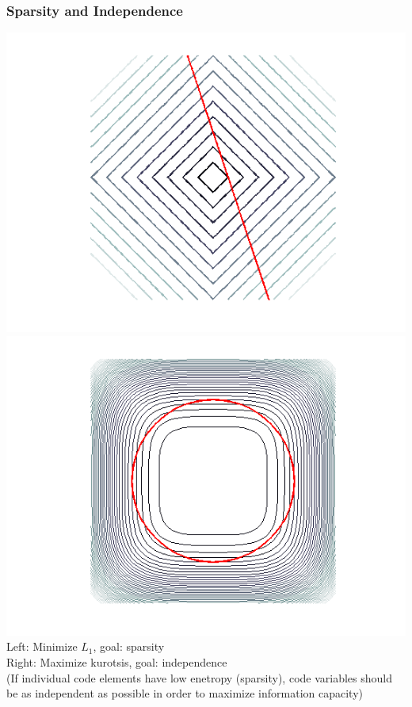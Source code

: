 \documentclass{beamer}
\begin{document}
\begin{frame} 
\begin{center}
\frametitle{Sparsity and Independence} 
\includegraphics[scale = 0.3]{./images/DQE/L1.png}
\includegraphics[scale = 0.3]{./images/DQE/ICA.png}\\
Left: Minimize $L_1$, goal: sparsity\\ Right: Maximize kurotsis, goal: independence\\
(If individual code elements have low enetropy (sparsity), code variables should be as independent as possible in order to maximize information capacity)
\end{center}
\end{frame}
\end{document}
